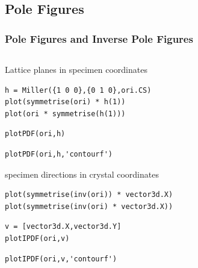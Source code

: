 \documentclass[compress]{beamer}
\begin{document}
\subsection*{Pole Figures}

\begin{frame}[fragile]
  \frametitle{Pole Figures and Inverse Pole Figures}

  \begin{columns}
    \begin{column}{8.5cm}
      Lattice planes in specimen coordinates
      \begin{lstlisting}[style=input]
h = Miller({1 0 0},{0 1 0},ori.CS)
plot(symmetrise(ori) * h(1))
plot(ori * symmetrise(h(1)))
      \end{lstlisting}

      \pause
      \medskip

      \begin{lstlisting}[style=input]
plotPDF(ori,h)
      \end{lstlisting}
      \pause
      \vspace{-0.3cm}
      \begin{lstlisting}[style=input]
plotPDF(ori,h,'contourf')
      \end{lstlisting}

      \pause
      \medskip

      specimen directions in crystal coordinates
      \begin{lstlisting}[style=input]
plot(symmetrise(inv(ori)) * vector3d.X)
plot(symmetrise(inv(ori) * vector3d.X))
      \end{lstlisting}
      \pause
      \vspace{-0.3cm}
      \begin{lstlisting}[style=input]
v = [vector3d.X,vector3d.Y]
plotIPDF(ori,v)
      \end{lstlisting}
      \pause
      \vspace{-0.3cm}
      \begin{lstlisting}[style=input]
plotIPDF(ori,v,'contourf')
      \end{lstlisting}


    \end{column}
    \begin{column}{3.5cm}


\end{column}
\end{columns}
\end{frame}
\end{document}
